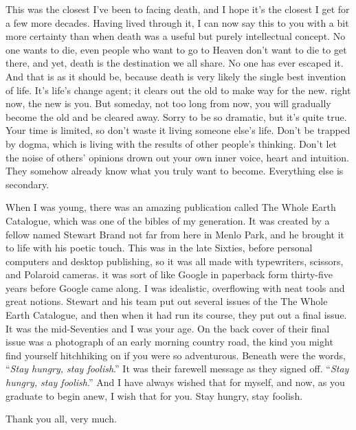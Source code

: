 \documentclass[12pt,a4paper,twocolumn]{article}
\begin{document}
This was the closest I've been to facing death, and I hope it's the closest I get for a few more decades. Having lived
through it, I can now say this to you with a bit more certainty than when death was a useful but purely intellectual
concept. No one wants to die, even people who want to go to Heaven don't want to die to get there, and yet, death is the
destination we all share. No one has ever escaped it. And that is as it should be, because death is very likely the single
best invention of life. It's life's change agent; it clears out the old to make way for the new. right now, the new is you.
But someday, not too long from now, you will gradually become the old and be cleared away. Sorry to be so dramatic, but it's
quite true. Your time is limited, so don't waste it living someone else's life. Don't be trapped by dogma, which is living
with the results of other people's thinking. Don't let the noise of others' opinions drown out your own inner voice, heart
and intuition. They somehow already know what you truly want to become. Everything else is secondary.

When I was young, there was an amazing publication called The Whole Earth Catalogue, which was one of the bibles of my
generation. It was created by a fellow named Stewart Brand not far from here in Menlo Park, and he brought it to life with
his poetic touch. This was in the late Sixties, before personal computers and desktop publishing, so it was all made with
typewriters, scissors, and Polaroid cameras. it was sort of like Google in paperback form thirty-five years before Google
came along. I was idealistic, overflowing with neat tools and great notions. Stewart and his team put out several issues of
the The Whole Earth Catalogue, and then when it had run its course, they put out a final issue. It was the mid-Seventies and
I was your age. On the back cover of their final issue was a photograph of an early morning country road, the kind you might
find yourself hitchhiking on if you were so adventurous. Beneath were the words, ``\emph{Stay hungry, stay foolish}.'' It
was their farewell message as they signed off. ``\emph{Stay hungry, stay foolish}.'' And I have always wished that for
myself, and now, as you graduate to begin anew, I wish that for you. Stay hungry, stay foolish.

Thank you all, very much.
\end{document}

